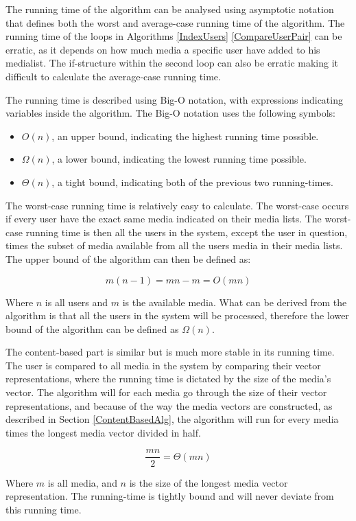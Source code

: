 The running time of the algorithm can be analysed using asymptotic notation that defines both the worst and average-case running time of the algorithm. The running time of the loops in Algorithms \ref{IndexUsers} \ref{CompareUserPair} can be erratic, as it depends on how much media a specific user have added to his medialist. The if-structure within the second loop can also be erratic making it difficult to calculate the average-case running time.

The running time is described using Big-O notation, with expressions indicating variables inside the algorithm. The Big-O notation uses the following symbols:
\begin{itemize}
	\item $O(n)$, an upper bound, indicating the highest running time possible.
	\item $\Omega(n)$, a lower bound, indicating the lowest running time possible.
	\item $\Theta(n)$, a tight bound, indicating both of the previous two running-times.
\end{itemize}

The worst-case running time is relatively easy to calculate. The worst-case occurs if every user have the exact same media indicated on their media lists. The worst-case running time is then all the users in the system, except the user in question, times the subset of media available from all the users media in their media lists. The upper bound of the algorithm can then be defined as:

\[
m(n-1) = mn - m = O(mn)
\]

Where $n$ is all users and $m$ is the available media. What can be derived from the algorithm is that all the users in the system will be processed, therefore the lower bound of the algorithm can be defined as $\Omega(n)$.

The content-based part is similar but is much more stable in its running time. The user is compared to all media in the system by comparing their vector representations, where the running time is dictated by the size of the media's vector. The algorithm will for each media go through the size of their vector representations, and because of the way the media vectors are constructed, as described in Section \ref{ContentBasedAlg}, the algorithm will run for every media times the longest media vector divided in half.

\[
\frac{mn}{2} = \Theta(mn)
\]

Where $m$ is all media, and $n$ is the size of the longest media vector representation. The running-time is tightly bound and will never deviate from this running time.
